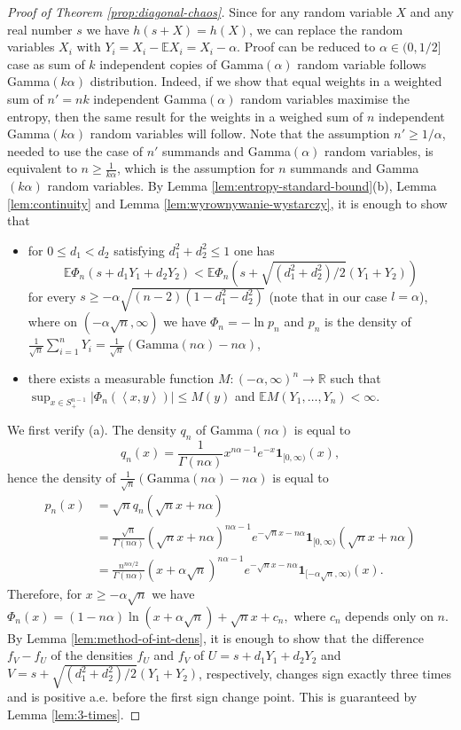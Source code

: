 \documentclass[11pt]{amsart}
\newcommand{\1}{\mathbf{1}}
\newcommand{\R}{\mathbb{R}}
\newcommand{\E}{\mathbb{E}}
\newcommand{\scal}[2]{\left\langle #1, #2\right\rangle}
\theoremstyle{definition}
\theoremstyle{definition}
\theoremstyle{remark}
\begin{document}
\begin{proof}[Proof of Theorem \ref{prop:diagonal-chaos}]
Since for any random variable $X$ and any real number $s$ we have $h(s+X)=h(X)$, we can replace the random variables $X_i$ with $Y_i=X_i-\E X_i = X_i - \alpha$. 
Proof can be reduced to $\alpha\in(0,1/2]$ case as sum of $k$ independent copies of Gamma$(\alpha)$ random variable follows Gamma$(k\alpha)$ distribution. 
Indeed, if we show that equal weights in a weighted sum of $n' = nk$ independent Gamma$(\alpha)$ random variables maximise the entropy, then the same result for the weights in a weighed sum of $n$ independent Gamma$(k\alpha)$ random variables will follow. Note that the assumption $n' \geq 1/\alpha$, needed to use the case of $n'$ summands and Gamma$(\alpha)$ random variables, is equivalent to $n \geq \frac{1}{k\alpha}$, which is the assumption for $n$ summands and Gamma$(k\alpha)$ random variables.  
By Lemma \ref{lem:entropy-standard-bound}(b), Lemma \ref{lem:continuity} and Lemma \ref{lem:wyrownywanie-wystarczy}, it is enough to show that 
\begin{itemize}
\item[(a)]
for $0 \leq d_1 <  d_2$ satisfying $d_1^2+d_2^2 \leq 1$ one has 
\[
	\E \Phi_n (s+d_1 Y_1 + d_2 Y_2) < \E \Phi_n \left(s+ \sqrt{(d_1^2+d_2^2)/2}(Y_1 + Y_2) \right)
\] 
for every $s \geq -\alpha \sqrt{(n-2)(1-d_1^2-d_2^2)}$ (note that in our case $l=\alpha$), where on $(-\alpha\sqrt{n},\infty)$ we have $\Phi_n = - \ln p_n$ and $p_n$ is the density of $\frac{1}{\sqrt{n}} \sum_{i=1}^n Y_i = \frac{1}{\sqrt{n}}( \text{Gamma}(n\alpha)-n\alpha)$, 
\item[(b)] there exists a measurable function $M:(-\alpha,\infty)^n \to \R$ such that $\sup_{x \in S_+^{n-1}} |\Phi_n(\scal{x}{y})| \leq M(y)$ and $\E M(Y_1,\ldots, Y_n) < \infty$.
\end{itemize}


We first verify (a). The density $q_n$ of Gamma$(n\alpha)$ is equal to 
\[
q_n(x) = \frac{1}{\Gamma(n\alpha)} x^{n\alpha-1} e^{-x} \1_{[0,\infty)}(x),
\]
 hence the density of $\frac{1}{\sqrt{n}} (\text{Gamma}(n\alpha)-n\alpha)$ is equal to
\begin{align*}
	p_n(x) 
	  & = \sqrt{n}q_n(\sqrt{n}x+n\alpha) \\ 
	  & =  \frac{\sqrt{n}}{\Gamma(n\alpha)} (\sqrt{n}x+n\alpha)^{n\alpha-1} e^{-\sqrt{n}x - n\alpha} \1_{[0,\infty)}(\sqrt{n}x + n\alpha) \\
	  & =  \frac{n^{n\alpha/2}}{\Gamma(n\alpha)} (x + \alpha\sqrt{n})^{n\alpha  -1} e^{-\sqrt{n}x - n\alpha} \1_{[-\alpha\sqrt{n},\infty)}(x).
\end{align*}
Therefore, for $x \geq -\alpha \sqrt{n}$ we have
$
	\Phi_n(x) =  \left( 1 - n\alpha \right) \ln (x + \alpha\sqrt{n}) + \sqrt{n}x  + c_n,
$ 
where $c_n$ depends only on $n$. By Lemma \ref{lem:method-of-int-dens}, it is enough to show that the difference $f_V-f_U$ of the densities $f_U$ and $f_V$ of $U=s+d_1 Y_1 + d_2 Y_2$ and $V=s+\sqrt{(d_1^2+d_2^2)/2}(Y_1+Y_2)$, respectively, changes sign exactly three times and is positive a.e. before the first sign change point. This is guaranteed by Lemma \ref{lem:3-times}.    


\end{proof}
\end{document}

